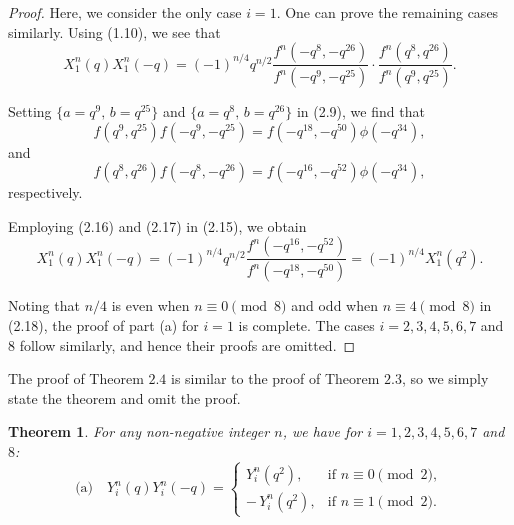 \documentclass[11pt,a4paper]{article}
\numberwithin{equation}{section}
\theoremstyle{plain}
\newtheorem{theorem}{Theorem}[section]
\begin{document}
	\begin{proof}
		Here, we consider the only case $i=1$. One can prove the remaining cases similarly.
		Using (1.10), we see that
		\begin{equation}
			X_1^{n}(q)X_1^{n}(-q)
			=
			(-1)^{n/4} q^{n/2}
			\frac{f^n(-q^{8},-q^{26})}{f^n(-q^{9},-q^{25})}
			\cdot
			\frac{f^n(q^{8},q^{26})}{f^n(q^{9},q^{25})}.
			\tag{2.15}
		\end{equation}
		
		Setting $\{a=q^{9},\, b=q^{25}\}$ and $\{a=q^{8},\, b=q^{26}\}$ in (2.9), we find that
		\begin{equation}
			f(q^{9},q^{25})f(-q^{9},-q^{25})=f(-q^{18},-q^{50})\phi(-q^{34}),
			\tag{2.16}
		\end{equation}
		and
		\begin{equation}
			f(q^{8},q^{26})f(-q^{8},-q^{26})=f(-q^{16},-q^{52})\phi(-q^{34}),
			\tag{2.17}
		\end{equation}
		respectively.
		
		Employing (2.16) and (2.17) in (2.15), we obtain
		\begin{equation}
			X_1^{n}(q)X_1^{n}(-q)
			=
			(-1)^{n/4} q^{n/2}
			\frac{f^n(-q^{16},-q^{52})}{f^n(-q^{18},-q^{50})}
			=
			(-1)^{n/4} X_1^{n}(q^2).
			\tag{2.18}
		\end{equation}
		
		Noting that $n/4$ is even when $n \equiv 0 \pmod{8}$ and odd when $n \equiv 4 \pmod{8}$ in (2.18), the proof of part (a) for $i=1$ is complete. The cases $i=2,3,4,5,6,7$ and $8$ follow similarly, and hence their proofs are omitted.
	\end{proof}
	
	The proof of Theorem $2.4$ is similar to the proof of Theorem $2.3$, so we simply state the theorem and omit the proof.
	
	
	\begin{theorem}
		For any non-negative integer $n$, we have for $i=1,2,3,4,5,6,7$ and $8$:
		\[
		\text{(a)}\quad
		Y_i^{n}(q)Y_i^{n}(-q)=
		\begin{cases}
			Y_i^{n}(q^2), & \text{if } n \equiv 0 \pmod{2},\\
			-\,Y_i^{n}(q^2), & \text{if } n \equiv 1 \pmod{2}.
		\end{cases}
		\]
	\end{theorem}
	
	
\end{document}
